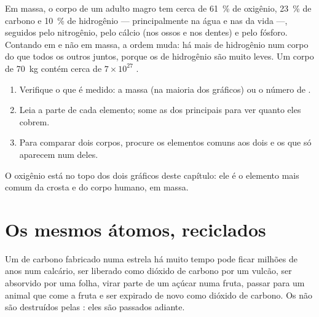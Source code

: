 \begin{proposition}\label{prop:g9:elements-universe-earth:body}
Em massa, o corpo de um adulto magro tem cerca de \qty{61}{\percent} de
oxigênio, \qty{23}{\percent} de carbono e \qty{10}{\percent} de
hidrogênio --- principalmente na água e nas  da vida ---,
seguidos pelo nitrogênio, pelo cálcio (nos ossos e nos dentes) e pelo
fósforo. Contando em  e não em massa, a ordem muda: há mais
 de hidrogênio num corpo do que todos os outros  juntos,
porque os  de hidrogênio são muito leves. Um corpo de
\qty{70}{kg} contém cerca de $7 \times 10^{27}$ .
\end{proposition}

\begin{method}\label{met:g9:elements-universe-earth:read}
\begin{enumerate}
  \item Verifique o que é medido: a massa (na maioria dos gráficos) ou o
        número de .
  \item Leia a parte de cada elemento; some as dos principais para ver
        quanto eles cobrem.
  \item Para comparar dois corpos, procure os elementos comuns aos dois
        e os que só aparecem num deles.
\end{enumerate}
O oxigênio está no topo dos dois gráficos deste capítulo: ele é o
elemento mais comum da crosta e do corpo humano, em massa.
\end{method}

\section{Os mesmos átomos, reciclados}

\begin{example}\label{ex:g9:elements-universe-earth:journey}
Um  de carbono fabricado numa estrela há muito tempo pode ficar
milhões de anos num calcário, ser liberado como dióxido de carbono por
um vulcão, ser absorvido por uma folha, virar parte de um açúcar numa
fruta, passar para um animal que come a fruta e ser expirado de novo
como dióxido de carbono. Os  não são destruídos pelas
: eles são passados adiante.
\end{example}

